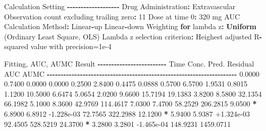 \documentclass[
  10pt,
]{krantz}
\makeatletter
\newenvironment{Shaded}{\begin{snugshade}}{\end{snugshade}}
\newcommand{\ControlFlowTok}[1]{\textcolor[rgb]{0.13,0.29,0.53}{\textbf{#1}}}
\newcommand{\DecValTok}[1]{\textcolor[rgb]{0.00,0.00,0.81}{#1}}
\newcommand{\FloatTok}[1]{\textcolor[rgb]{0.00,0.00,0.81}{#1}}
\newcommand{\KeywordTok}[1]{\textcolor[rgb]{0.13,0.29,0.53}{\textbf{#1}}}
\newcommand{\NormalTok}[1]{#1}
\newcommand{\OperatorTok}[1]{\textcolor[rgb]{0.81,0.36,0.00}{\textbf{#1}}}
\newcommand{\StringTok}[1]{\textcolor[rgb]{0.31,0.60,0.02}{#1}}
\newenvironment{kframe}{%
\medskip{}
\setlength{\fboxsep}{.8em}
 \def\at@end@of@kframe{}%
 \ifinner\ifhmode%
  \def\at@end@of@kframe{\end{minipage}}%
  \begin{minipage}{\columnwidth}%
 \fi\fi%
 \def\FrameCommand##1{\hskip\@totalleftmargin \hskip-\fboxsep
 \colorbox{shadecolor}{##1}\hskip-\fboxsep
     \hskip-\linewidth \hskip-\@totalleftmargin \hskip\columnwidth}%
 \MakeFramed {\advance\hsize-\width
   \@totalleftmargin\z@ \linewidth\hsize
   \@setminipage}}%
 {\par\unskip\endMakeFramed%
 \at@end@of@kframe}
\renewenvironment{Shaded}{\begin{kframe}}{\end{kframe}}
\makeatother
\begin{document}
\begin{Shaded}
\begin{Highlighting}[]
\NormalTok{Calculation Setting}
\OperatorTok{{-}{-}{-}{-}{-}{-}{-}{-}{-}{-}{-}{-}{-}{-}{-}{-}{-}{-}{-}}
\NormalTok{Drug Administration}\OperatorTok{:}\StringTok{ }\NormalTok{Extravascular}
\NormalTok{Observation count excluding trailing zero}\OperatorTok{:}\StringTok{ }\DecValTok{11}
\NormalTok{Dose at time }\DecValTok{0}\OperatorTok{:}\StringTok{ }\DecValTok{320}\NormalTok{ mg}
\NormalTok{AUC Calculation Method}\OperatorTok{:}\StringTok{ }\NormalTok{Linear}\OperatorTok{{-}}\NormalTok{up Linear}\OperatorTok{{-}}\NormalTok{down}
\NormalTok{Weighting }\ControlFlowTok{for}\NormalTok{ lambda z}\OperatorTok{:}\StringTok{ }\KeywordTok{Uniform}\NormalTok{ (Ordinary Least Square, OLS)}
\NormalTok{Lambda z selection criterion}\OperatorTok{:}\StringTok{ }\NormalTok{Heighest adjusted R}\OperatorTok{{-}}\NormalTok{squared value with precision=}\FloatTok{1e{-}4}


\NormalTok{Fitting, AUC, AUMC Result}
\OperatorTok{{-}{-}{-}{-}{-}{-}{-}{-}{-}{-}{-}{-}{-}{-}{-}{-}{-}{-}{-}{-}{-}{-}{-}{-}{-}}
\StringTok{      }\NormalTok{Time         Conc.      Pred.   Residual       AUC       AUMC}
\OperatorTok{{-}{-}{-}{-}{-}{-}{-}{-}{-}{-}{-}{-}{-}{-}{-}{-}{-}{-}{-}{-}{-}{-}{-}{-}{-}{-}{-}{-}{-}{-}{-}{-}{-}{-}{-}{-}{-}{-}{-}{-}{-}{-}{-}{-}{-}{-}{-}{-}{-}{-}{-}{-}{-}{-}{-}{-}{-}{-}{-}{-}{-}{-}{-}{-}{-}{-}{-}{-}{-}}
\StringTok{     }\FloatTok{0.0000}       \FloatTok{0.7400}                           \FloatTok{0.0000}     \FloatTok{0.0000}
     \FloatTok{0.2500}       \FloatTok{2.8400}                           \FloatTok{0.4475}     \FloatTok{0.0888}
     \FloatTok{0.5700}       \FloatTok{6.5700}                           \FloatTok{1.9531}     \FloatTok{0.8015}
     \FloatTok{1.1200}      \FloatTok{10.5000}                           \FloatTok{6.6474}     \FloatTok{5.0654}
     \FloatTok{2.0200}       \FloatTok{9.6600}                          \FloatTok{15.7194}    \FloatTok{19.1383}
     \FloatTok{3.8200}       \FloatTok{8.5800}                          \FloatTok{32.1354}    \FloatTok{66.1982}
     \FloatTok{5.1000}       \FloatTok{8.3600}                          \FloatTok{42.9769}   \FloatTok{114.4617}
     \FloatTok{7.0300}       \FloatTok{7.4700}                          \FloatTok{58.2529}   \FloatTok{206.2815}
     \FloatTok{9.0500} \OperatorTok{*}\StringTok{     }\FloatTok{6.8900}     \FloatTok{6.8912} \FloatTok{{-}1.228e{-}03}    \FloatTok{72.7565}   \FloatTok{322.2988}
    \FloatTok{12.1200} \OperatorTok{*}\StringTok{     }\FloatTok{5.9400}     \FloatTok{5.9387} \FloatTok{+1.324e{-}03}    \FloatTok{92.4505}   \FloatTok{528.5219}
    \FloatTok{24.3700} \OperatorTok{*}\StringTok{     }\FloatTok{3.2800}     \FloatTok{3.2801} \FloatTok{{-}1.465e{-}04}   \FloatTok{148.9231}  \FloatTok{1459.0711}


\end{Highlighting}
\end{Shaded}
\end{document}
